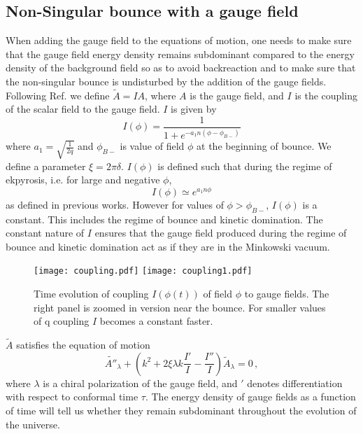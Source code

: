 \documentclass[12pt,a4paper]{article}
\numberwithin{equation}{section}
\numberwithin{equation}{section}
\begin{document}
\subsection{Non-Singular bounce with a gauge field}
When adding the gauge field to the equations of motion, one needs to make sure that the gauge field energy density remains subdominant compared to the energy density of the background field so as to avoid backreaction and to make sure that the non-singular bounce is undisturbed by the addition of the gauge fields. 
Following Ref. \cite{Caprini:2014mja,r1,r3} we define $\tilde{A}=IA$, where
$A$ is the gauge field, and $I$ is the coupling of the scalar field to the gauge field. $I$ is given by
\begin{equation}
    I(\phi) = \frac{1}{1+e^{-a_1 n (\phi-\phi_{B-})}}
    \label{eq:I}
\end{equation}
where $a_1 =\sqrt{ \frac{1}{2q}}$ and $\phi_{B-}$ is value of field $\phi$ at the beginning of bounce. We define a parameter $\xi= 2\pi \delta $.
$I(\phi)$ is defined such that during the regime of ekpyrosis, i.e. for large and negative $\phi$, 
\begin{equation}
     I(\phi) \simeq e^{a_1 n \phi}
\end{equation}
as defined in previous works. However for values of  $\phi>\phi_{B-}$, $I(\phi)$ is a constant. This includes the regime of bounce and kinetic domination. The constant nature of $I$ ensures that the gauge field produced during the regime of bounce and kinetic domination act as if they are in the Minkowski vacuum.\\
\begin{figure}[H]
    \centering
    \texttt{[image: coupling.pdf]} 
    \hfill
    \texttt{[image: coupling1.pdf]} 
     \caption{Time evolution of coupling $I(\phi(t))$ of field $\phi$ to gauge fields. The right panel is zoomed in version near the bounce. For smaller values of q coupling $I$ becomes a constant faster.} 
\label{fig:gag}
\end{figure}
$\tilde{A}$ satisfies the equation of motion
\begin{equation}
\tilde{A''}_{\lambda}+\left(k^2+ 2\xi \lambda k \frac{I'}{I} -  \frac{I''}{I}\right) \tilde{A}_{\lambda} = 0 \, \label{eq:guage},
\end{equation} 
where $\lambda$ is a chiral polarization of the gauge field, and $'$ denotes differentiation with respect to conformal time $\tau$. The energy density of gauge fields as a function of time will tell us whether they remain subdominant throughout the evolution of the universe.\\
\end{document}
